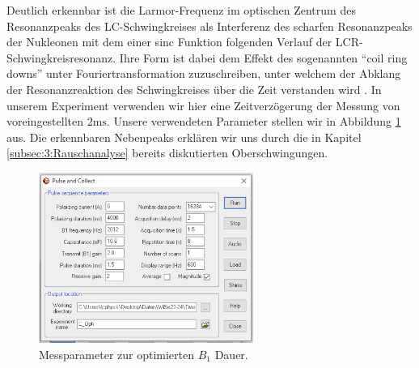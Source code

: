 \documentclass[../../main.tex]{subfiles}
\begin{document}
            Deutlich erkennbar ist die Larmor-Frequenz im optischen Zentrum des Resonanzpeaks des LC-Schwingkreises als Interferenz des scharfen Resonanzpeaks der Nukleonen mit dem einer sinc Funktion folgenden Verlauf der LCR-Schwingkreisresonanz. Ihre Form ist dabei dem Effekt des sogenannten \enquote{coil ring downs} unter Fouriertransformation zuzuschreiben, unter welchem der Abklang der Resonanzreaktion des Schwingkreises über die Zeit verstanden wird \cite[ch 1.4.5]{doc:EFNMRStudentManual}. In unserem Experiment verwenden wir hier eine Zeitverzögerung der Messung von voreingestellten $2\si{\ms}$. Unsere verwendeten Parameter stellen wir in Abbildung \ref{fig:5.1:B1OptiParameter} aus. Die erkennbaren Nebenpeaks erklären wir uns durch die in Kapitel \ref{subsec:3:Rauschanalyse} bereits diskutierten Oberschwingungen. 
            \begin{figure}[H]
                \centering
                \includegraphics[width=7cm]{Bilddateien/5/C_Abtastparameter.png}
                \caption{Messparameter zur optimierten $B_1$ Dauer.}
                \label{fig:5.1:B1OptiParameter}
            \end{figure}
\end{document}
